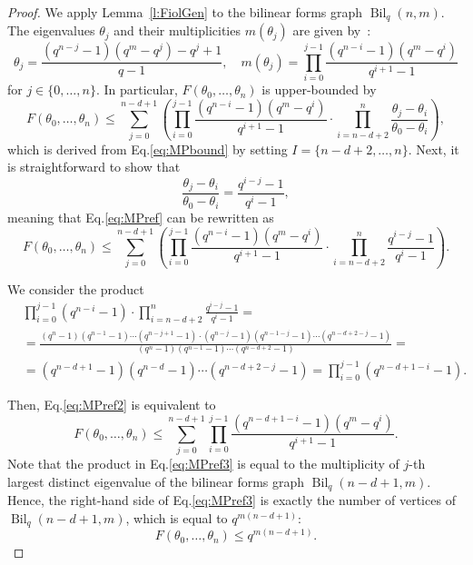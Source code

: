 \documentclass[a4paper]{article}
\newcommand{\Bil}{\operatorname{Bil}}
\begin{document}
\begin{proof} We apply Lemma~\ref{l:FiolGen} to the bilinear forms graph $\Bil_q(n,m)$. The eigenvalues $\theta_j$ and their multiplicities $m(\theta_j)$ are given by~\cite{BCNbookDRG}:
\begin{equation}\label{eq:Bil_evals}
\theta_j = \frac{(q^{n-j}-1)(q^m-q^j)-q^j+1}{q-1},\quad m(\theta_j)=\prod_{i=0}^{j-1}\frac{(q^{n-i}-1)(q^m-q^i)}{q^{i+1}-1}
\end{equation}
for $j\in\{0,\dots,n\}$. In particular, $F(\theta_0,\dots,\theta_n)$ is upper-bounded by
\begin{equation}\label{eq:MPref}
    F(\theta_0,\dots,\theta_n)\leq\sum\limits_{j=0}^{n-d+1} \left( \prod_{i=0}^{j-1}\frac{(q^{n-i}-1)(q^m-q^i)}{q^{i+1}-1} \cdot \prod\limits_{i=n-d+2}^n\frac{\theta_j-\theta_i}{\theta_0-\theta_i}\right),
\end{equation}
which is derived from Eq.\:\eqref{eq:MPbound} by setting $I=\{n-d+2,\dots,n\}$. Next, it is straightforward to show that
$$\frac{\theta_j-\theta_i}{\theta_0-\theta_i} = \frac{q^{i-j}-1}{q^i-1},$$ meaning that Eq.\:\eqref{eq:MPref} can be rewritten as
\begin{equation}\label{eq:MPref2}
    F(\theta_0,\dots,\theta_n)\leq\sum\limits_{j=0}^{n-d+1} \left( \prod_{i=0}^{j-1}\frac{(q^{n-i}-1)(q^m-q^i)}{q^{i+1}-1} \cdot \prod\limits_{i=n-d+2}^n\frac{q^{i-j}-1}{q^i-1}\right).
\end{equation}

We consider the product
{\footnotesize{
\begin{align*}
    &\prod_{i=0}^{j-1}(q^{n-i}-1) \cdot \prod\limits_{i=n-d+2}^n\frac{q^{i-j}-1}{q^i-1} = \\
    &= \frac{(q^n-1)(q^{n-1}-1)\cdots(q^{n-j+1}-1)\cdot (q^{n-j}-1)(q^{n-1-j}-1)\cdots(q^{n-d+2-j}-1)}{(q^n-1)(q^{n-1}-1)\cdots(q^{n-d+2}-1)} =\\
    &= (q^{n-d+1}-1)(q^{n-d}-1)\cdots(q^{n-d+2-j}-1) = \prod\limits_{i=0}^{j-1} (q^{n-d+1-i}-1).
\end{align*}
}}

Then, Eq.\:\eqref{eq:MPref2} is equivalent to
\begin{equation}\label{eq:MPref3}
    F(\theta_0,\dots,\theta_n)\leq\sum\limits_{j=0}^{n-d+1} \prod_{i=0}^{j-1}\frac{(q^{n-d+1-i}-1)(q^m-q^i)}{q^{i+1}-1}.    
\end{equation}
Note that the product in Eq.\:\eqref{eq:MPref3} is equal to the multiplicity of $j$-th largest distinct eigenvalue of the bilinear forms graph $\Bil_q(n-d+1,m)$. Hence, the right-hand side of Eq.\:\eqref{eq:MPref3} is exactly the number of vertices of $\Bil_q(n-d+1,m)$, which is equal to $q^{m(n-d+1)}$:
\begin{equation}\label{eq:MPfinal}
    F(\theta_0,\dots,\theta_n)\leq q^{m(n-d+1)}.
\end{equation}


\end{proof}
\end{document}
